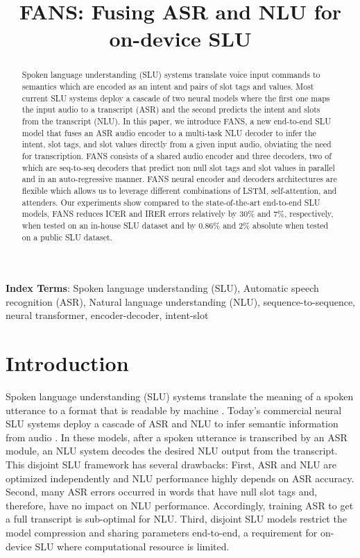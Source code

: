 \documentclass[a4paper]{article}
\title{  FANS: Fusing ASR and NLU for on-device  SLU }
\begin{document}
\maketitle
% 
\begin{abstract}

Spoken language understanding (SLU) systems translate  voice input commands to   semantics which are encoded as  an intent and pairs of slot tags and values.  Most current SLU systems deploy a cascade of two  neural models where the first one  maps the input audio to a transcript (ASR) and the second  predicts the intent and slots from the transcript (NLU). In this paper, we introduce FANS, a new end-to-end  SLU model that fuses an ASR audio encoder to a multi-task NLU decoder to infer  the  intent, slot tags, and slot values directly from a given input audio, obviating the need for transcription. FANS consists of a shared audio  encoder and three decoders, two of which are seq-to-seq decoders that predict non null slot tags and slot values in parallel and in an auto-regressive manner. FANS neural encoder and decoders architectures are flexible which allows us to leverage different combinations of LSTM, self-attention, and  attenders. Our experiments show compared to the state-of-the-art  end-to-end SLU models, FANS reduces ICER and IRER errors relatively by 30\%  and 7\%, respectively, when tested on an in-house SLU dataset and by  0.86\% and 2\%  absolute when tested on a public SLU dataset.
\end{abstract}


\noindent\textbf{Index Terms}: Spoken language understanding (SLU), Automatic speech recognition (ASR), Natural language understanding (NLU), sequence-to-sequence, neural transformer, encoder-decoder, intent-slot 

\section{Introduction}

Spoken language understanding (SLU) systems  translate  the meaning of  a spoken utterance  to a format that is readable by machine \cite{wang2005spoken,TurDeMori2011,Bhargava2013EasyCI}. Today's commercial neural SLU systems deploy a cascade of ASR and NLU to infer semantic information from audio \cite{DBLP:journals/ftir/LarsonJ12}. In these models,  after a spoken utterance is transcribed by  an ASR module,  an NLU system decodes the desired NLU output from the transcript. This disjoint SLU framework has several drawbacks: First, ASR and NLU are optimized independently and NLU performance highly depends on ASR accuracy.  Second, many ASR errors occurred in  words that  have  null slot tags and, therefore, have no impact on NLU performance. Accordingly, training ASR to get a full transcript is sub-optimal for NLU. Third, disjoint SLU models restrict the model compression and sharing parameters end-to-end, a requirement for on-device SLU where  computational resource is limited. 
\end{document}
